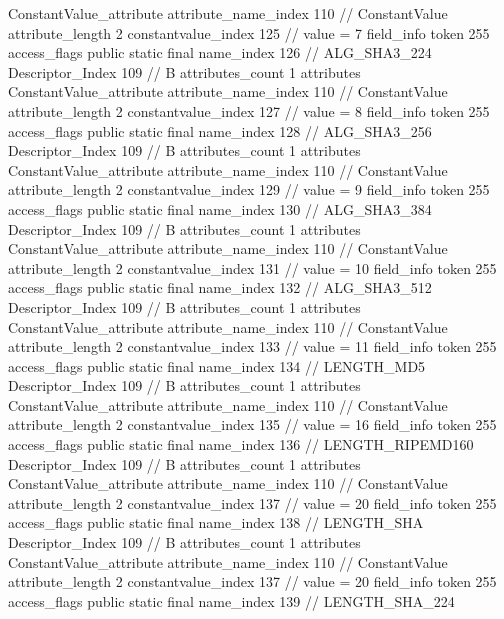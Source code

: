 {{{{{{				ConstantValue_attribute {
					attribute_name_index	110		// ConstantValue
					attribute_length	2
					constantvalue_index	125		// value = 7
				}
				}
			}
			field_info {
				token	255
				access_flags	public static final
				name_index	126		// ALG_SHA3_224
				Descriptor_Index	109		// B
				attributes_count	1
				attributes {
				ConstantValue_attribute {
					attribute_name_index	110		// ConstantValue
					attribute_length	2
					constantvalue_index	127		// value = 8
				}
				}
			}
			field_info {
				token	255
				access_flags	public static final
				name_index	128		// ALG_SHA3_256
				Descriptor_Index	109		// B
				attributes_count	1
				attributes {
				ConstantValue_attribute {
					attribute_name_index	110		// ConstantValue
					attribute_length	2
					constantvalue_index	129		// value = 9
				}
				}
			}
			field_info {
				token	255
				access_flags	public static final
				name_index	130		// ALG_SHA3_384
				Descriptor_Index	109		// B
				attributes_count	1
				attributes {
				ConstantValue_attribute {
					attribute_name_index	110		// ConstantValue
					attribute_length	2
					constantvalue_index	131		// value = 10
				}
				}
			}
			field_info {
				token	255
				access_flags	public static final
				name_index	132		// ALG_SHA3_512
				Descriptor_Index	109		// B
				attributes_count	1
				attributes {
				ConstantValue_attribute {
					attribute_name_index	110		// ConstantValue
					attribute_length	2
					constantvalue_index	133		// value = 11
				}
				}
			}
			field_info {
				token	255
				access_flags	public static final
				name_index	134		// LENGTH_MD5
				Descriptor_Index	109		// B
				attributes_count	1
				attributes {
				ConstantValue_attribute {
					attribute_name_index	110		// ConstantValue
					attribute_length	2
					constantvalue_index	135		// value = 16
				}
				}
			}
			field_info {
				token	255
				access_flags	public static final
				name_index	136		// LENGTH_RIPEMD160
				Descriptor_Index	109		// B
				attributes_count	1
				attributes {
				ConstantValue_attribute {
					attribute_name_index	110		// ConstantValue
					attribute_length	2
					constantvalue_index	137		// value = 20
				}
				}
			}
			field_info {
				token	255
				access_flags	public static final
				name_index	138		// LENGTH_SHA
				Descriptor_Index	109		// B
				attributes_count	1
				attributes {
				ConstantValue_attribute {
					attribute_name_index	110		// ConstantValue
					attribute_length	2
					constantvalue_index	137		// value = 20
				}
				}
			}
			field_info {
				token	255
				access_flags	public static final
				name_index	139		// LENGTH_SHA_224
}}}}}
